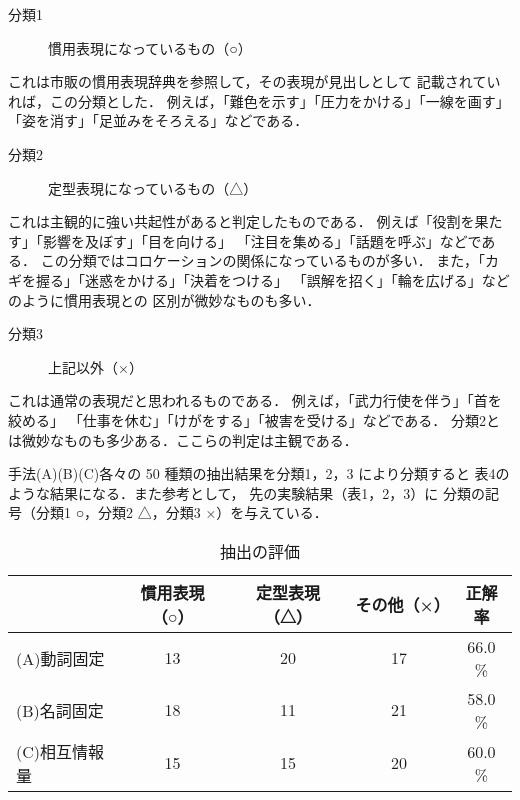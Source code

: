 \begin{description}
\item[分類1] 慣用表現になっているもの（○）
\end{description}

これは市販の慣用表現辞典\cite{inoue2}を参照して，その表現が見出しとして
記載されていれば，この分類とした．
例えば，「難色を示す」「圧力をかける」「一線を画す」
「姿を消す」「足並みをそろえる」などである．


\begin{description}
\item[分類2] 定型表現になっているもの（△）
\end{description}

これは主観的に強い共起性があると判定したものである．
例えば「役割を果たす」「影響を及ぼす」「目を向ける」
「注目を集める」「話題を呼ぶ」などである．
この分類ではコロケーションの関係になっているものが多い．
また，「カギを握る」「迷惑をかける」「決着をつける」
「誤解を招く」「輪を広げる」などのように慣用表現との
区別が微妙なものも多い．

\begin{description}
\item[分類3] 上記以外（×）
\end{description}

これは通常の表現だと思われるものである．
例えば，「武力行使を伴う」「首を絞める」
「仕事を休む」「けがをする」「被害を受ける」などである．
分類2とは微妙なものも多少ある．ここらの判定は主観である．


手法(A)(B)(C)各々の 50 種類の抽出結果を分類1，2，3 により分類すると
表4のような結果になる．また参考として，
先の実験結果（表1，2，3）に
分類の記号（分類1 ○，分類2 △，分類3 ×）を与えている．


\begin{table}[htbp]
  \begin{center}
    \begin{tabular}{|l||c|c|c|c|} \hline
          &  慣用表現（○）  & 定型表現（△）& その他（×）&  正解率 \\  \hline \hline
(A)動詞固定  &    13       &       20      &   17        &   66.0 \%  \\ \hline
(B)名詞固定  &    18       &       11      &   21        &   58.0 \%  \\ \hline
(C)相互情報量 &   15       &       15      &   20        &   60.0 \%  \\ \hline
    \end{tabular}
  \end{center}
  \caption{抽出の評価}
\end{table}



